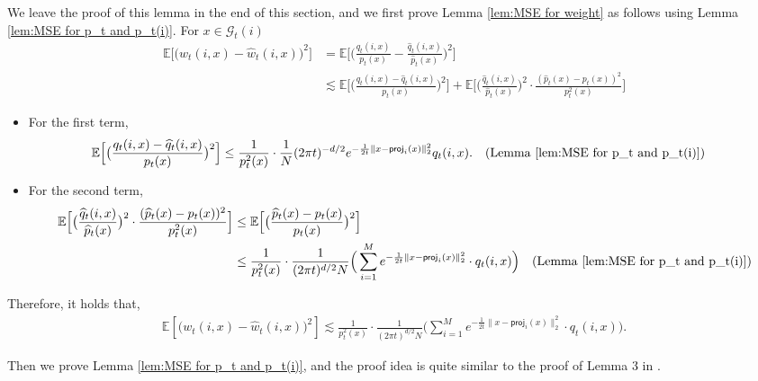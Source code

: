 \documentclass{article}
\newcommand{\proj}{\mathsf{proj}}
\theoremstyle{plain}
\theoremstyle{remark}
\begin{document}
We leave the proof of this lemma in the end of this section, and we first prove Lemma \ref{lem:MSE for weight} as follows using Lemma \ref{lem:MSE for p_t and p_t(i)}. 
For $x\in \mathcal{G}_t(i)$
\begin{align*}
    \mathbb{E}\big[\big(w_t(i,x)-\widehat{w}_t(i,x) \big)^2\big] &= \mathbb{E} \Big[\big(\frac{q_t(i,x)}{p_t(x)} - \frac{\widehat{q}_t(i,x)}{\widehat{p}_t(x)}\big)^2 \Big] \\
    &\lesssim \mathbb{E} \Big[ \big(\frac{q_t(i,x)-\widehat{q}_t(i,x)}{p_t(x)}\big)^2\Big] + \mathbb{E} \Big[ \big( \frac{\widehat{q}_t(i,x)}{\widehat{p}_t(x)}\big)^2 \cdot \frac{(\widehat{p}_t(x)-p_t(x))^2}{p_t^2(x)}\Big] 
\end{align*}
\begin{itemize}
    \item For the first term, 
    \begin{align*}
        \mathbb{E} \Big[ \big( \frac{q_t(i,x)-\widehat{q}_t(i,x)}{p_t(x)}\big)^2\Big] &\leq \frac{1}{p_t^2(x)} \cdot \frac{1}{N}(2\pi t)^{-d/2} e^{-\frac{1}{2t} \| x-\proj_i(x)\|_2^2} q_t(i,x). \quad (\text{Lemma \ref{lem:MSE for p_t and p_t(i)}})
    \end{align*}

    \item For the second term, 
    \begin{align*}
        \mathbb{E} \Big[ \big( \frac{\widehat{q}_t(i,x)}{\widehat{p}_t(x)}\big)^2 \cdot \frac{(\widehat{p}_t(x)-p_t(x))^2}{p_t^2(x)}\Big]  &\leq \mathbb{E} \Big[ \big( \frac{\widehat{p}_t(x)-p_t(x)}{p_t(x)}\big)^2\Big] \\
        &\leq \frac{1}{p_t^2(x)} \cdot \frac{1}{(2\pi t)^{d/2}N} \Big(\sum_{i=1}^M e^{-\frac{1}{2t}\|x-\proj_i(x)\|_2^2} \cdot q_t(i,x) \Big) \quad (\text{Lemma \ref{lem:MSE for p_t and p_t(i)}})
    \end{align*}
\end{itemize}
Therefore, it holds that, 
    \begin{align*}
        \mathbb{E}[\big(w_t(i,x)-\widehat{w}_t(i,x) \big)^2] \lesssim \frac{1}{p_t^2(x)} \cdot \frac{1}{(2\pi t)^{d/2}N} \Big(\sum_{i=1}^M e^{-\frac{1}{2t}\|x-\proj_i(x)\|_2^2} \cdot q_t(i,x) \Big) .
    \end{align*}

Then we prove Lemma \ref{lem:MSE for p_t and p_t(i)}, and the proof idea is quite similar to the proof of Lemma 3 in \citet{cai2025minimaxoptimalityprobabilityflow}. 
\end{document}
